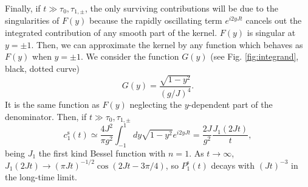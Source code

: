 \documentclass[aps,pra,twocolumn,floatfix,superscriptaddress]{revtex4-1}%
\begin{document}
Finally, if $t\gg \tau_0,\tau_{1,\pm}$, the only surviving contributions will be due to the singularities of $F(y)$ because the rapidly oscillating term $e^{i2yJt}$ cancels out the integrated contribution of any smooth part of the kernel. $F(y)$ is singular at $y=\pm 1$. Then, we can approximate the kernel by any function which behaves as $F(y)$ when $y=\pm 1$. We consider the function $G(y)$ (see Fig. \ref{fig:integrand}, black, dotted curve)
\begin{equation}
G(y)=\frac{\sqrt{1-y^2}}{(g/J)^4}.\label{eq:G}
\end{equation}
It is the same function as $F(y)$ neglecting the $y$-dependent part of the denominator. Then, if $t\gg \tau_0,\tau_{1,\pm}$
\begin{equation}
c_1^\text{s}(t) \simeq  \frac{4J^2}{\pi g^2}\int_{-1}^1 dy \sqrt{1-y^2} e^{i2yJt}=\frac{2J}{g^2 }\frac{J_1(2Jt)}{t},
\label{eq:c_sc_bessel}
\end{equation}
being $J_1$ the first kind Bessel function with $n=1$. As $t\to\infty$, $J_1(2Jt)\to (\pi Jt)^{-1/2}\cos(2Jt-3\pi /4)$, so $P_1^\text{s}(t)$ decays with $(Jt)^{-3}$ in the long-time limit.

\end{document}
